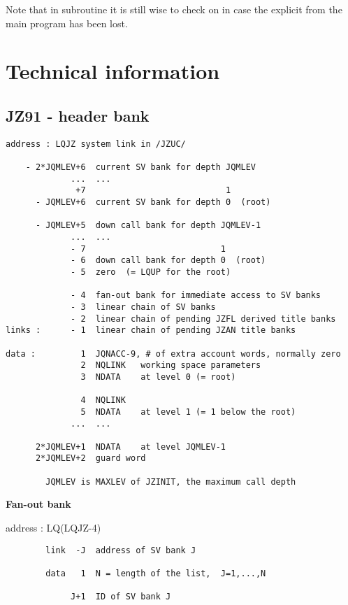 Note that in subroutine  it is still wise to check on 
in case the explicit  from the main program has been lost.

\chapter{Technical information}

\section{JZ91 - header bank}

\begin{verbatim}
address : LQJZ system link in /JZUC/

    - 2*JQMLEV+6  current SV bank for depth JQMLEV
             ...  ...
              +7                            1
      - JQMLEV+6  current SV bank for depth 0  (root)

      - JQMLEV+5  down call bank for depth JQMLEV-1
             ...  ...
             - 7                           1
             - 6  down call bank for depth 0  (root)
             - 5  zero  (= LQUP for the root)

             - 4  fan-out bank for immediate access to SV banks
             - 3  linear chain of SV banks
             - 2  linear chain of pending JZFL derived title banks
links :      - 1  linear chain of pending JZAN title banks

data :         1  JQNACC-9, # of extra account words, normally zero
               2  NQLINK   working space parameters
               3  NDATA    at level 0 (= root)

               4  NQLINK
               5  NDATA    at level 1 (= 1 below the root)
             ...  ...

      2*JQMLEV+1  NDATA    at level JQMLEV-1
      2*JQMLEV+2  guard word

        JQMLEV is MAXLEV of JZINIT, the maximum call depth
\end{verbatim} 

{\large\bf Fan-out bank}

address : LQ(LQJZ-4)

\begin{verbatim}
        link  -J  address of SV bank J

        data   1  N = length of the list,  J=1,...,N

             J+1  ID of SV bank J
\end{verbatim} 
\newpage

